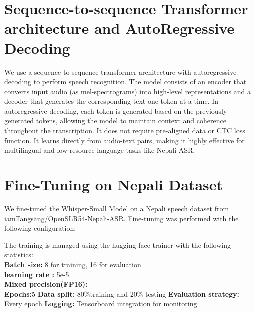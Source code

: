 \section{ Sequence-to-sequence Transformer architecture and AutoRegressive Decoding}
 We use a sequence-to-sequence transformer architecture with autoregressive decoding to perform speech recognition. The model consists of an encoder that converts input audio (as mel-spectrograms) into high-level representations and a decoder that generates the corresponding text one token at a time. In autoregressive decoding, each token is generated based on the previously generated tokens, allowing the model to maintain context and coherence throughout the transcription. It does not require pre-aligned data or CTC loss function. It learns directly from audio-text pairs, making it highly effective for multilingual and low-resource language tasks like Nepali ASR.

\section{Fine-Tuning on Nepali Dataset}
We fine-tuned the Whisper-Small Model on a Nepali speech dataset from iamTangsang/OpenSLR54-Nepali-ASR. Fine-tuning was performed with the following configuration:
\begin{itemize}
    The training is managed using the hugging face trainer with the following statistics:\\
 \textbf{Batch size:} 8 for training, 16 for evaluation\\
 \textbf{learning rate :} 5e-5\\
 \textbf{Mixed precision(FP16):} \\
 \textbf{Epochs:}5
 \textbf{Data split:} 80\%training and 20\% testing
 \textbf{Evaluation strategy:} Every epoch 
 \textbf{Logging:} Tensorboard integration for monitoring

 
\end{itemize}

 


% 
